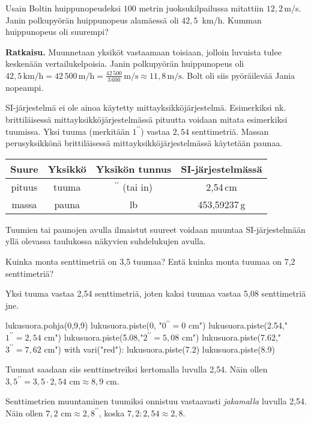 \begin{esimerkki}
Usain Boltin huippunopeudeksi $100$ metrin juoksukilpailussa mitattiin $12,2$\,m/s. Janin polkupyörän huippunopeus alamäessä oli $42,5$\, km/h. Kumman huippunopeus oli suurempi?

\textbf{Ratkaisu.}
Muunnetaan yksiköt vastaamaan toisiaan, jolloin luvuista tulee keskenään vertailukelpoisia. Janin polkupyörän huippunopeus oli $42,5\,\textrm{km/h} = 42\,500\,\textrm{m/h} = \frac{42\,500}{3\,600}\,\textrm{m/s} \approx 11,8\,\textrm{m/s}$.
Bolt oli siis pyöräilevää Jania nopeampi.
\end{esimerkki}

SI-järjestelmä ei ole ainoa käytetty mittayksikköjärjestelmä. Esimerkiksi nk. brittiläisessä mittayksikköjärjestelmässä pituutta voidaan mitata esimerkiksi tuumissa. Yksi tuuma (merkitään $1^{\prime \prime}$) vastaa $2,54$
 senttimetriä. Massan perusyksikkönä brittiläisessä mittayksikköjärjestelmässä käytetään paunaa.

\begin{tabular}{c|c|c|c}
Suure & Yksikkö & Yksikön tunnus & SI-järjestelmässä\\
\hline
pituus & tuuma & $^{\prime \prime}$ (tai in) & 2,54\,cm \\
massa & pauna & lb & 453,59237\,g \\
\end{tabular}

Tuumien tai paunojen avulla ilmaistut suureet voidaan muuntaa SI-järjestelmään yllä olevassa taulukossa näkyvien suhdelukujen avulla.

\begin{esimerkki}
Kuinka monta senttimetriä on 3,5 tuumaa? Entä kuinka monta tuumaa on 7,2 senttimetriä?

	\begin{esimratk}
Yksi tuuma vastaa 2,54 senttimetriä, joten kaksi tuumaa vastaa 5,08 senttimetriä jne.
	
\begin{kuva}
	lukusuora.pohja(0,9,9)
	lukusuora.piste(0, "$0^{\prime \prime} = 0 $ cm")
	lukusuora.piste(2.54,"$1^{\prime \prime} = 2,54$ cm")
	lukusuora.piste(5.08,"$2^{\prime \prime} = 5,08$ cm")
	lukusuora.piste(7.62,"$3^{\prime \prime} = 7,62$ cm")
	with vari("red"):
	  lukusuora.piste(7.2)
	  lukusuora.piste(8.9)
\end{kuva}

Tuumat saadaan siis senttimetreiksi kertomalla luvulla 2,54. Näin ollen $3,5^{\prime \prime} = 3,5 \cdot 2,54 \textrm{ cm} \approx 8,9 \textrm{ cm}$.

Senttimetrien muuntaminen tuumiksi onnistuu vastaavasti \emph{jakamalla} luvulla 2,54. Näin ollen $7,2 \textrm{ cm} \approx 2,8^{\prime \prime}$, koska $7,2 : 2,54 \approx 2,8$.
	\end{esimratk}
\end{esimerkki}

